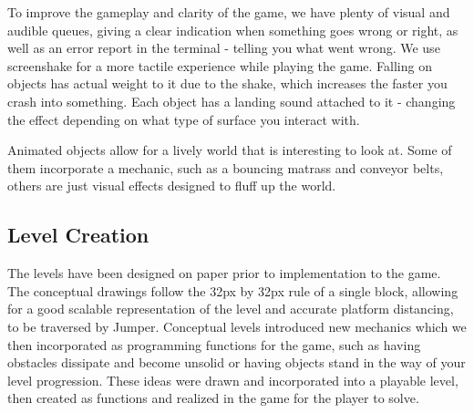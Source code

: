 \documentclass[a4paper,twoside,12pt]{article}
\begin{document}
To improve the gameplay and clarity of the game, we have plenty of visual and audible queues, giving a clear indication when something goes wrong or right, as well as an error report in the terminal - telling you what went wrong. We use screenshake for a more tactile experience while playing the game. Falling on objects has actual weight to it due to the shake, which increases the faster you crash into something. Each object has a landing sound attached to it - changing the effect depending on what type of surface you interact with.

Animated objects allow for a lively world that is interesting to look at. Some of them incorporate a mechanic, such as a bouncing matrass and conveyor belts, others are just visual effects designed to fluff up the world. 


\subsection{Level Creation}
The levels have been designed on paper prior to implementation to the game. The conceptual drawings follow the 32px by 32px rule of a single block, allowing for a good scalable representation of the level and accurate platform distancing, to be traversed by Jumper. Conceptual levels introduced new mechanics which we then incorporated as programming functions for the game, such as having obstacles dissipate and become unsolid or having objects stand in the way of your level progression. These ideas were drawn and incorporated into a playable level, then created as functions and realized in the game for the player to solve.
\end{document}
